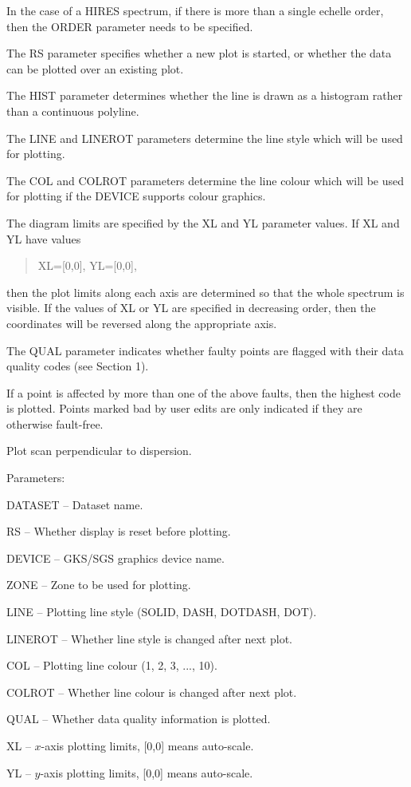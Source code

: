 \begin {description}
\begin {description}
In the case of a HIRES spectrum, if there is more than a single
echelle order, then the ORDER parameter needs to be specified.

The RS parameter specifies whether a new plot is started, or whether
the data can be plotted over an existing plot.

The HIST parameter determines whether the line is drawn as a histogram
rather than a continuous polyline.

The LINE and LINEROT parameters determine the line style which will be
used for plotting.

The COL and COLROT parameters determine the line colour which will be used
for plotting if the DEVICE supports colour graphics.

The diagram limits are specified by the XL and YL parameter values.
If XL and YL have values

\begin {quote}
XL=[0,0], YL=[0,0],
\end {quote}
then the plot limits along each axis are determined so that the whole
spectrum is visible.
If the values of XL or YL are specified in decreasing order, then
the coordinates will be reversed along the appropriate axis.

The QUAL parameter indicates whether faulty points are flagged with
their data quality codes (see Section 1).

If a point is affected by more than one of the above faults, then
the highest code is plotted.
Points marked bad by user edits are only indicated if they are otherwise
fault-free.
\end {description}

\item [PLSCAN]
Plot scan perpendicular to dispersion.

\begin {description}
\item Parameters:

\begin {description}
\item DATASET -- Dataset name.
\item RS -- Whether display is reset before plotting.
\item DEVICE -- GKS/SGS graphics device name.
\item ZONE -- Zone to be used for plotting.
\item LINE -- Plotting line style (SOLID, DASH, DOTDASH, DOT).
\item LINEROT -- Whether line style is changed after next plot.
\item COL -- Plotting line colour (1, 2, 3, ..., 10).
\item COLROT -- Whether line colour is changed after next plot.
\item QUAL -- Whether data quality information is plotted.
\item XL -- $x$-axis plotting limits, [0,0] means auto-scale.
\item YL -- $y$-axis plotting limits, [0,0] means auto-scale.
\end {description}


\end{description}
\end{description}
